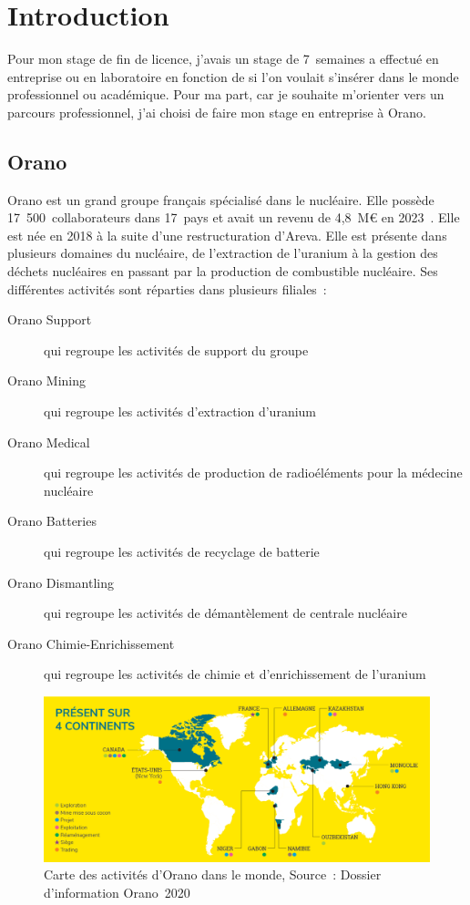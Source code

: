 \section{Introduction}

Pour mon stage de fin de licence, j'avais un stage de 7~semaines a effectué en entreprise ou en laboratoire en fonction de si l'on voulait s'insérer dans le monde professionnel ou académique. Pour ma part, car je souhaite  m'orienter vers un parcours professionnel, j'ai choisi de faire mon stage en entreprise à Orano.
\subsection{Orano}
Orano est un grand groupe français spécialisé dans le nucléaire. Elle possède 17~500~collaborateurs dans 17~pays et avait un revenu de 4,8~M€ en 2023~\cite{report:rapport_activiter}. Elle est née en 2018 à la suite d'une restructuration d'Areva. Elle est présente dans plusieurs domaines du nucléaire, de l'extraction de l'uranium à la gestion des déchets nucléaires en passant par la production de combustible nucléaire. Ses différentes activités sont réparties dans plusieurs filiales~:
\begin{description}
\item [Orano Support] qui regroupe les activités de support du groupe
\item [Orano Mining]qui regroupe les activités d'extraction d'uranium
\item [Orano Medical]qui regroupe les activités de production de radioéléments pour la médecine nucléaire
\item [Orano Batteries]qui regroupe les activités de recyclage de batterie
\item [Orano Dismantling]qui regroupe les activités de démantèlement de centrale nucléaire
\item [Orano Chimie-Enrichissement]qui regroupe les activités de chimie et d'enrichissement de l'uranium
\end{description}
\begin{figure}
    \centering
    \includegraphics[width=\textwidth]{img/Carte-ornao-international.png}
    \caption[Carte des activités d’Orano dans le monde]{Carte des activités d’Orano dans le monde, Source~: Dossier d’information Orano~2020}
    \label{fig_carte_orano}
\end{figure}









